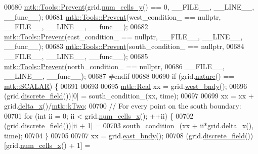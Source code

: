 \begin{DoxyCode}
00680   \hyperlink{classmtk_1_1Tools_a332324c6f25e66be9dff48c5987a3b9f}{mtk::Tools::Prevent}(grid.\hyperlink{classmtk_1_1UniStgGrid2D_aed05a801cc9a76dba0ff203cea58a61a}{num\_cells\_y}() == 0, \_\_FILE\_\_, \_\_LINE\_\_, \_\_func\_\_);
00681   \hyperlink{classmtk_1_1Tools_a332324c6f25e66be9dff48c5987a3b9f}{mtk::Tools::Prevent}(west\_condition\_ == \textcolor{keyword}{nullptr}, \_\_FILE\_\_, \_\_LINE\_\_, \_\_func\_\_);
00682   \hyperlink{classmtk_1_1Tools_a332324c6f25e66be9dff48c5987a3b9f}{mtk::Tools::Prevent}(east\_condition\_ == \textcolor{keyword}{nullptr}, \_\_FILE\_\_, \_\_LINE\_\_, \_\_func\_\_);
00683   \hyperlink{classmtk_1_1Tools_a332324c6f25e66be9dff48c5987a3b9f}{mtk::Tools::Prevent}(south\_condition\_ == \textcolor{keyword}{nullptr},
00684                       \_\_FILE\_\_, \_\_LINE\_\_, \_\_func\_\_);
00685   \hyperlink{classmtk_1_1Tools_a332324c6f25e66be9dff48c5987a3b9f}{mtk::Tools::Prevent}(north\_condition\_ == \textcolor{keyword}{nullptr},
00686                       \_\_FILE\_\_, \_\_LINE\_\_, \_\_func\_\_);
00687 \textcolor{preprocessor}{  #endif}
00688 
00690   \textcolor{keywordflow}{if} (grid.\hyperlink{classmtk_1_1UniStgGrid2D_a99a3a9cdb05b7306be99bde935509e30}{nature}() == \hyperlink{namespacemtk_ga4c54f2a329cfb4e56213b02a259d19e2af481d45bd70d41381c7d72e200889205}{mtk::SCALAR}) \{
00691 
00693 
00695     \hyperlink{group__c01-roots_gac080bbbf5cbb5502c9f00405f894857d}{mtk::Real} xx = grid.\hyperlink{classmtk_1_1UniStgGrid2D_af2b1712387ded85edaf2b64617d3fc13}{west\_bndy}();
00696     (grid.\hyperlink{classmtk_1_1UniStgGrid2D_a3e72d59843a3f9c5e47da07e5850dfe0}{discrete\_field}())[0] = south\_condition\_(xx, time);
00697 
00699     xx = xx + grid.\hyperlink{classmtk_1_1UniStgGrid2D_aca4710004c4a7da6a9e8fd6ab32a691f}{delta\_x}()/\hyperlink{group__c01-roots_gaf39c2d851a2db744f4feb1c5ab3ec2cf}{mtk::kTwo};
00700     \textcolor{comment}{// For every point on the south boundary:}
00701     \textcolor{keywordflow}{for} (\textcolor{keywordtype}{int} ii = 0; ii < grid.\hyperlink{classmtk_1_1UniStgGrid2D_a2d182866a398aba8e4829590e85bf939}{num\_cells\_x}(); ++ii) \{
00702       (grid.\hyperlink{classmtk_1_1UniStgGrid2D_a3e72d59843a3f9c5e47da07e5850dfe0}{discrete\_field}())[ii + 1] =
00703         south\_condition\_(xx + ii*grid.\hyperlink{classmtk_1_1UniStgGrid2D_aca4710004c4a7da6a9e8fd6ab32a691f}{delta\_x}(), time);
00704     \}
00705 
00707     xx = grid.\hyperlink{classmtk_1_1UniStgGrid2D_a03f689eb29a6369b82ce1207c655d5ff}{east\_bndy}();
00708     (grid.\hyperlink{classmtk_1_1UniStgGrid2D_a3e72d59843a3f9c5e47da07e5850dfe0}{discrete\_field}())[grid.\hyperlink{classmtk_1_1UniStgGrid2D_a2d182866a398aba8e4829590e85bf939}{num\_cells\_x}() + 1] =

\end{DoxyCode}
